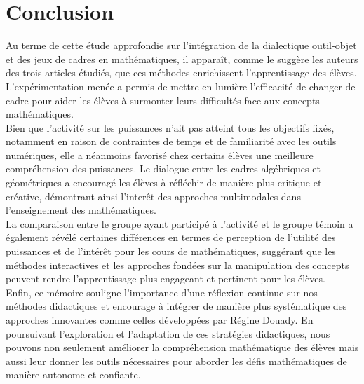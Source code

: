 \section*{Conclusion}

Au terme de cette étude approfondie sur l'intégration de la dialectique outil-objet et des jeux de cadres en mathématiques,
il apparaît,
comme le suggère les auteurs des trois articles étudiés,
que ces méthodes enrichissent l'apprentissage des élèves.
L'expérimentation menée a permis de mettre en lumière l'efficacité de changer de cadre pour aider les élèves à surmonter leurs difficultés face aux concepts mathématiques.\\

Bien que l'activité sur les puissances n'ait pas atteint tous les objectifs fixés,
notamment en raison de contraintes de temps et de familiarité avec les outils numériques,
elle a néanmoins favorisé chez certains élèves une meilleure compréhension des puissances.
Le dialogue entre les cadres algébriques et géométriques a encouragé les élèves à réfléchir de manière plus critique et créative,
démontrant ainsi l'interêt des approches multimodales dans l'enseignement des mathématiques.\\

La comparaison entre le groupe ayant participé à l'activité et le groupe témoin a également révélé certaines différences en termes de perception de l'utilité des puissances et de l'intérêt pour les cours de mathématiques,
suggérant que les méthodes interactives et les approches fondées sur la manipulation des concepts peuvent rendre l'apprentissage plus engageant et pertinent pour les élèves.\\

Enfin,
ce mémoire souligne l'importance d'une réflexion continue sur nos méthodes didactiques et encourage à intégrer de manière plus systématique des approches innovantes comme celles développées par Régine Douady.
En poursuivant l'exploration et l'adaptation de ces stratégies didactiques,
nous pouvons non seulement améliorer la compréhension mathématique des élèves mais aussi leur donner les outils nécessaires pour aborder les défis mathématiques de manière autonome et confiante.
